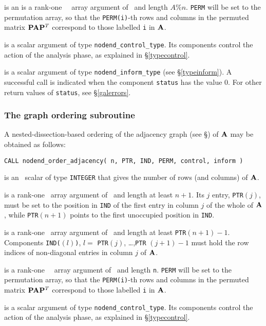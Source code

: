 \documentclass{galahad}
\newcommand{\packagename}{nodend}
\begin{document}
\begin{description}
\begin{description}
 is an 
 is a rank-one \integer\ \out\ array argument
of \intentout\ and length $A\%n$.
{\tt PERM} will be set to the permutation array, so that the 
{\tt PERM(i)}-th rows and columns in the permuted matrix 
${\mathbf{P}} {\mathbf{A}} {\mathbf{P}}^T$ correspond to those labelled {\tt i} in ${\mathbf{A}}$.

 is a scalar \intentout argument of type
{\tt \packagename\_control\_type}. Its components control the action
of the analysis phase, as explained in
\S\ref{typecontrol}.

 is a scalar \intentout argument of type
{\tt \packagename\_inform\_type}
(see \S\ref{typeinform}).
A successful call is indicated when the  component {\tt status} has the value 0.
For other return values of {\tt status}, see \S\ref{galerrors}.

\end{description}

\subsubsection{The graph ordering subroutine}\label{subinit}
A nested-dissection-based ordering of the adjacency graph (see \S\galgraph)
of ${\mathbf{A}}$ may be obtained as follows:

\hskip0.5in
{\tt CALL \packagename\_order\_adjacency( n, PTR, IND, PERM, control, inform )}
\begin{description}
 is an \intentin\ scalar of type  {\tt INTEGER} that gives the
number of rows (and columns) of ${\mathbf{A}}$.

 is a rank-one \integer\ array argument of \in\ and length 
 at least $n+1$. Its $j$ entry, {\tt PTR}$(j)$, must be set to the position
 in {\tt IND} of the first entry in column $j$ of the whole of ${\mathbf{A}}$,
 while {\tt PTR}$(n+1)$ points to the first unoccupied position in {\tt IND}.

 is a rank-one \integer\ array argument of \in\ and length 
 at least  {\tt PTR}$(n+1)-1$. Components
 {\tt IND(}$(l)${\tt )}, $l =$ {\tt PTR}$(j)$, \ldots ,{\tt PTR} $(j+1)-1$
 must hold the row indices of non-diagonal entries in column $j$ of ${\mathbf{A}}$.

 is a rank-one \integer\ \out\ array argument
 of \intentout\ and length {\tt n}.
 {\tt PERM} will be set to the permutation array, so that the 
 {\tt PERM(i)}-th rows and columns in the permuted matrix 
 ${\mathbf{P}} {\mathbf{A}} {\mathbf{P}}^T$ correspond to those labelled {\tt i} in ${\mathbf{A}}$.

 is a scalar \intentout argument of type
{\tt \packagename\_control\_type}. Its components control the action
of the analysis phase, as explained in
\S\ref{typecontrol}.


\end{description}
\end{description}
\end{document}
